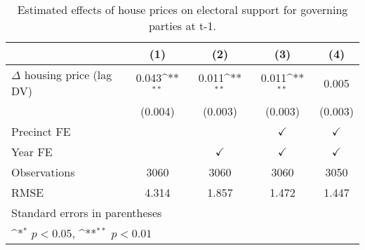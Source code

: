 \begin{table}[htbp]\centering
\def\sym#1{\ifmmode^{#1}\else\(^{#1}\)\fi}
\caption{Estimated effects of house prices on electoral support for governing parties at t-1.} \label{prelagdv}
\begin{tabular}{l*{4}{c}}
\hline\hline
                    &\multicolumn{1}{c}{(1)}        &\multicolumn{1}{c}{(2)}        &\multicolumn{1}{c}{(3)}        &\multicolumn{1}{c}{(4)}        \\
\hline
$\Delta$ housing price (lag DV)&       0.043\sym{**}&       0.011\sym{**}&       0.011\sym{**}&       0.005        \\
                    &     (0.004)        &     (0.003)        &     (0.003)        &     (0.003)        \\
[1em]
\hline Precinct FE  &                    &                    &$\checkmark$        &$\checkmark$        \\
[1em]
Year FE             &                    &$\checkmark$        &$\checkmark$        &$\checkmark$        \\
\hline
Observations        &        3060        &        3060        &        3060        &        3050        \\
RMSE                &       4.314        &       1.857        &       1.472        &       1.447        \\
\hline\hline
\multicolumn{5}{l}{\footnotesize Standard errors in parentheses}\\
\multicolumn{5}{l}{\footnotesize \sym{*} \(p<0.05\), \sym{**} \(p<0.01\)}\\
\end{tabular}
\end{table}
